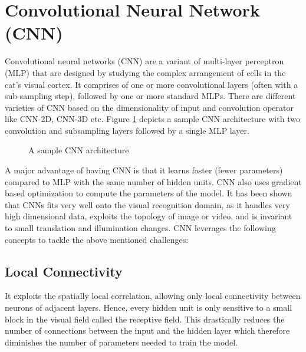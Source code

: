 \section{Convolutional Neural Network (CNN)}
 \label{sec:cnn}
 \par Convolutional neural networks (CNN) are a variant of multi-layer perceptron (MLP) that are designed by studying the complex arrangement of cells in the cat's visual cortex.  It comprises of one or more convolutional layers (often with a sub-sampling step), followed by one or more standard MLPs.  There are different varieties of CNN based on the dimensionality of input and convolution operator like CNN-2D, CNN-3D etc.  Figure \ref{fig:cnnarchitecture} depicts a sample CNN architecture with two convolution and subsampling layers followed by a single MLP layer.
 
\begin{figure}[htpb]
   \begin{center}
   		{%
			\setlength{\fboxsep}{5pt}%
	    }%
     \caption[] {A sample CNN architecture \footnotemark}
	\label{fig:cnnarchitecture}  
   \end{center}
 \end{figure} 
\par A major advantage of having CNN is that it learns faster (fewer parameters) compared to MLP with the same number of hidden units.  CNN  also uses gradient based optimization to compute the parameters of the model.  It has been shown that CNNs fits very well onto the visual recognition domain, as it handles very high dimensional data, exploits the topology of image or video, and is invariant to small translation and illumination changes.  CNN leverages the following concepts to tackle the above mentioned challenges:
\subsection{Local Connectivity}
It exploits the spatially local correlation, allowing only local connectivity between neurons of adjacent layers.  Hence, every hidden unit is only sensitive to a small block in the visual field called the receptive field. This drastically reduces the number of connections between the input and the hidden layer which therefore diminishes the number of parameters needed to train the model.
